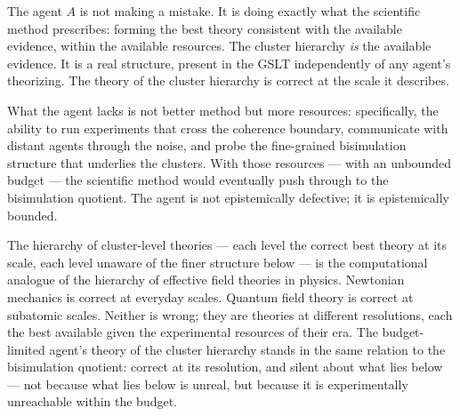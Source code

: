 The agent $A$ is not making a mistake.
It is doing exactly what the scientific method prescribes: forming
the best theory consistent with the available evidence, within the
available resources.
The cluster hierarchy \emph{is} the available evidence.
It is a real structure, present in the GSLT independently of any
agent's theorizing.
The theory of the cluster hierarchy is correct at the scale it
describes.

What the agent lacks is not better method but more resources:
specifically, the ability to run experiments that cross the
coherence boundary, communicate with distant agents through the
noise, and probe the fine-grained bisimulation structure that
underlies the clusters.
With those resources --- with an unbounded budget --- the
scientific method would eventually push through to the bisimulation
quotient.
The agent is not epistemically defective; it is epistemically
bounded.

The hierarchy of cluster-level theories --- each level the
correct best theory at its scale, each level unaware of the
finer structure below --- is the computational analogue of the
hierarchy of effective field theories in physics.
Newtonian mechanics is correct at everyday scales.
Quantum field theory is correct at subatomic scales.
Neither is wrong; they are theories at different resolutions,
each the best available given the experimental resources of
their era.
The budget-limited agent's theory of the cluster hierarchy
stands in the same relation to the bisimulation quotient: correct
at its resolution, and silent about what lies below --- not
because what lies below is unreal, but because it is experimentally
unreachable within the budget.

